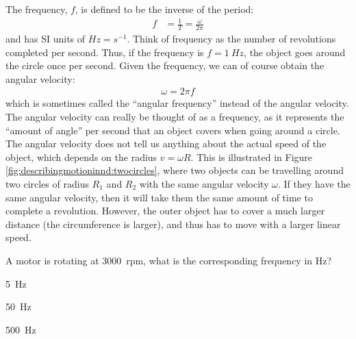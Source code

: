 The frequency, $f$, is defined to be the inverse of the period:
\begin{align*}
f&=\frac{1}{T}=\frac{\omega}{2\pi}
\end{align*}
and has SI units of $\si{Hz}=\si{s^{-1}}$. Think of frequency as the number of revolutions completed per second. Thus, if the frequency is $f=\SI{1}{Hz}$, the object goes around the circle once per second. Given the frequency, we can of course obtain the angular velocity:
\begin{align*}
\omega = 2\pi f
\end{align*}
which is sometimes called the ``angular frequency'' instead of the angular velocity. The angular velocity can really be thought of as a frequency, as it represents the ``amount of angle'' per second that an object covers when going around a circle. The angular velocity does not tell us anything about the actual speed of the object, which depends on the radius $v=\omega R$. This is illustrated in Figure \ref{fig:describingmotioninnd:twocircles}, where two objects can be travelling around two circles of radius $R_1$ and $R_2$ with the same angular velocity $\omega$. If they have the same angular velocity, then it will take them the same amount of time to complete a revolution. However, the outer object has to cover a much larger distance (the circumference is larger), and thus has to move with a larger linear speed.
\begin{checkpoint}{\begin{MCquestion}{A motor is rotating at \SI{3000}{rpm}, what is the corresponding frequency in \si{Hz}?}
\item \SI{5}{Hz}
\item \SI{50}{Hz}\correct
\item \SI{500}{Hz}
\end{MCquestion}}
\end{checkpoint}
\vspace{-0.5cm}
